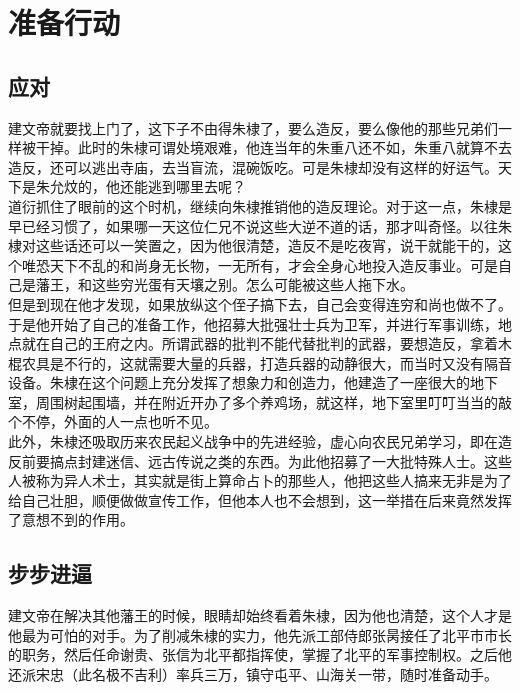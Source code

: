 \section{准备行动}
\ifnum{}
	\begin{multicols}{\theparacolNo}
\fi
\subsection{应对}
建文帝就要找上门了，这下子不由得朱棣了，要么造反，要么像他的那些兄弟们一样被干掉。此时的朱棣可谓处境艰难，他连当年的朱重八还不如，朱重八就算不去造反，还可以逃出寺庙，去当盲流，混碗饭吃。可是朱棣却没有这样的好运气。天下是朱允炆的，他还能逃到哪里去呢？\\

道衍抓住了眼前的这个时机，继续向朱棣推销他的造反理论。对于这一点，朱棣是早已经习惯了，如果哪一天这位仁兄不说这些大逆不道的话，那才叫奇怪。以往朱棣对这些话还可以一笑置之，因为他很清楚，造反不是吃夜宵，说干就能干的，这个唯恐天下不乱的和尚身无长物，一无所有，才会全身心地投入造反事业。可是自己是藩王，和这些穷光蛋有天壤之别。怎么可能被这些人拖下水。\\

但是到现在他才发现，如果放纵这个侄子搞下去，自己会变得连穷和尚也做不了。\\

于是他开始了自己的准备工作，他招募大批强壮士兵为卫军，并进行军事训练，地点就在自己的王府之内。所谓武器的批判不能代替批判的武器，要想造反，拿着木棍农具是不行的，这就需要大量的兵器，打造兵器的动静很大，而当时又没有隔音设备。朱棣在这个问题上充分发挥了想象力和创造力，他建造了一座很大的地下室，周围树起围墙，并在附近开办了多个养鸡场，就这样，地下室里叮叮当当的敲个不停，外面的人一点也听不见。\\

此外，朱棣还吸取历来农民起义战争中的先进经验，虚心向农民兄弟学习，即在造反前要搞点封建迷信、远古传说之类的东西。为此他招募了一大批特殊人士。这些人被称为异人术士，其实就是街上算命占卜的那些人，他把这些人搞来无非是为了给自己壮胆，顺便做做宣传工作，但他本人也不会想到，这一举措在后来竟然发挥了意想不到的作用。\\

\subsection{步步进逼}
建文帝在解决其他藩王的时候，眼睛却始终看着朱棣，因为他也清楚，这个人才是他最为可怕的对手。为了削减朱棣的实力，他先派工部侍郎张昺接任了北平市市长的职务，然后任命谢贵、张信为北平都指挥使，掌握了北平的军事控制权。之后他还派宋忠（此名极不吉利）率兵三万，镇守屯平、山海关一带，随时准备动手。\\


\end{multicols}
